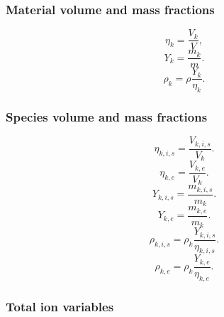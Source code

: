 \documentclass[a4paper,11pt]{report}
\begin{document}
\subsubsection{Material volume and mass fractions}

\begin{equation}
    \eta_k = \frac{V_k}{V},
\end{equation}
\begin{equation}
    Y_k = \frac{m_k}{m}.
\end{equation}
\begin{equation}
    \rho_k = \rho \frac{Y_k}{\eta_k}.
\end{equation}
 
\subsubsection{Species volume and mass fractions}

\begin{equation}
    \eta_{k,i,s} = \frac{V_{k,i,s}}{V_k}.
\end{equation}
\begin{equation}
    \eta_{k,e} = \frac{V_{k,e}}{V_k}.
\end{equation}
\begin{equation}
    Y_{k,i,s} = \frac{m_{k,i,s}}{m_k}.
\end{equation}
\begin{equation}
    Y_{k,e} = \frac{m_{k,e}}{m_k}.
\end{equation}
\begin{equation}
    \rho_{k,i,s} = \rho_k \frac{Y_{k,i,s}}{\eta_{k,i,s}}.
\end{equation}
\begin{equation}
    \rho_{k,e} = \rho_k \frac{Y_{k,e}}{\eta_{k,e}}.
\end{equation}

\subsubsection{Total ion variables}
\end{document}
